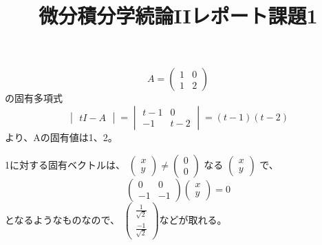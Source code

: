 \documentclass[12pt,a4]{article}
\title{微分積分学続論IIレポート課題1}
\date{}
\begin{document}
\maketitle


\begin{equation}
  A=
  \begin{pmatrix}
    1 & 0 \\
    1 & 2
  \end{pmatrix}
\end{equation}
の固有多項式
\begin{equation}
  \begin{vmatrix}
    tI-A
  \end{vmatrix}
  =
  \begin{vmatrix}
    t - 1 & 0 \\
    -1    & t - 2
  \end{vmatrix}
  = (t-1)(t-2)
\end{equation}
より、Aの固有値は1、2。

1に対する固有ベクトルは、
$
\left(
\begin{array}{c}
  x \\
  y
\end{array}
\right)
\neq
\left(
\begin{array}{c}
  0 \\
  0
\end{array}
\right)
$
なる
$
\left(
\begin{array}{c}
  x \\
  y
\end{array}
\right)
$ で、
\begin{equation}
  \begin{pmatrix}
    0 & 0 \\
    -1 & -1
  \end{pmatrix}
  \left(
  \begin{array}{c}
    x \\
    y
  \end{array}
  \right)
  = 0
\end{equation}
となるようなものなので、
$
\left(
\begin{array}{c}
  \frac{1}{\sqrt{2}}\\
  \frac{-1}{\sqrt{2}}
\end{array}
\right)
$などが取れる。
\end{document}
